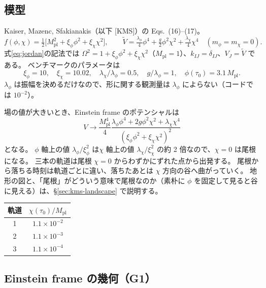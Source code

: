\documentclass[a4paper,11pt]{ltjsarticle}
\newcommand{\Mpl}{M_{\mathrm{pl}}}
\begin{document}
\subsection{模型}

Kaiser, Mazenc, Sfakianakis\cite{KMS2013}（以下 [KMS]）の Eqs.~(16)--(17)。
\[
f(\phi,\chi)=\tfrac12\big[\Mpl^2+\xi_\phi\phi^2+\xi_\chi\chi^2\big],\qquad
\tilde V=\tfrac{\lambda_\phi}4\phi^4+\tfrac g2\phi^2\chi^2+\tfrac{\lambda_\chi}4\chi^4\quad(m_\phi=m_\chi=0).
\]
式\eqref{eq:jordan}の記法では $\Omega^2=1+\xi_\phi\phi^2+\xi_\chi\chi^2$（$\Mpl=1$）、$k_{IJ}=\delta_{IJ}$、$V_J=\tilde V$ である。
ベンチマークのパラメータは
\[
\xi_\phi=10,\quad\xi_\chi=10.02,\quad\lambda_\chi/\lambda_\phi=0.5,\quad g/\lambda_\phi=1,\quad\phi(\tau_0)=3.1\,\Mpl .
\]
$\lambda_\phi$ は振幅を決めるだけなので、形に関する観測量は $\lambda_\phi$ によらない（コードでは $10^{-2}$）。

場の値が大きいとき、Einstein frame のポテンシャルは
\[
V\to\frac{\Mpl^4}{4}\frac{\lambda_\phi\phi^4+2g\phi^2\chi^2+\lambda_\chi\chi^4}{(\xi_\phi\phi^2+\xi_\chi\chi^2)^2}
\]
となる。
$\phi$ 軸上の値 $\lambda_\phi/\xi_\phi^2$ は$\chi$ 軸上の値 $\lambda_\chi/\xi_\chi^2$ の約 2 倍なので、$\chi=0$ は尾根になる。
三本の軌道は尾根 $\chi=0$ からわずかにずれた点から出発する。
尾根から落ちる時刻は軌道ごとに違い、落ちたあとは $\chi$ 方向の谷へ曲がっていく。
地形の図と、「尾根」がどういう意味で尾根なのか（素朴に $\phi$ を固定して見ると谷に見える）は、\S\ref{sec:kms-landscape} で説明する。

\begin{center}
\begin{tabular}{cc}
\toprule
軌道 & $\chi(\tau_0)/\Mpl$ \\
\midrule
1 & $1.1\times10^{-2}$ \\
2 & $1.1\times10^{-3}$ \\
3 & $1.1\times10^{-4}$ \\
\bottomrule
\end{tabular}
\end{center}

\subsection{Einstein frame の幾何（G1）}
\end{document}
